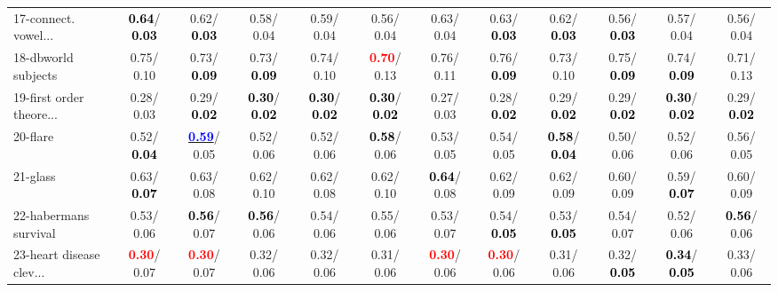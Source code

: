 \begin{table}[h]
\begin{center}
{\begin{tabular}{lc|c|c|c|c|c|c|c|c|c|c}
17-connect. vowel... & \textcolor{black}{\textbf{  0.64}}/\textcolor{black}{\textbf{  0.03}} &   0.62/\textcolor{black}{\textbf{  0.03}} &   0.58/  0.04 &   0.59/  0.04 &   0.56/  0.04 &   0.63/  0.04 &   0.63/\textcolor{black}{\textbf{  0.03}} &   0.62/\textcolor{black}{\textbf{  0.03}} &   0.56/\textcolor{black}{\textbf{  0.03}} &   0.57/  0.04 &   0.56/  0.04 \\
18-dbworld subjects &   0.75/  0.10 &   0.73/\textcolor{black}{\textbf{  0.09}} &   0.73/\textcolor{black}{\textbf{  0.09}} &   0.74/  0.10 & \textcolor{red}{\textbf{  0.70}}/  0.13 &   0.76/  0.11 &   0.76/\textcolor{black}{\textbf{  0.09}} &   0.73/  0.10 &   0.75/\textcolor{black}{\textbf{  0.09}} &   0.74/\textcolor{black}{\textbf{  0.09}} &   0.71/  0.13 \\
19-first order theore... &   0.28/  0.03 &   0.29/\textcolor{black}{\textbf{  0.02}} & \textcolor{black}{\textbf{  0.30}}/\textcolor{black}{\textbf{  0.02}} & \textcolor{black}{\textbf{  0.30}}/\textcolor{black}{\textbf{  0.02}} & \textcolor{black}{\textbf{  0.30}}/\textcolor{black}{\textbf{  0.02}} &   0.27/  0.03 &   0.28/\textcolor{black}{\textbf{  0.02}} &   0.29/\textcolor{black}{\textbf{  0.02}} &   0.29/\textcolor{black}{\textbf{  0.02}} & \textcolor{black}{\textbf{  0.30}}/\textcolor{black}{\textbf{  0.02}} &   0.29/\textcolor{black}{\textbf{  0.02}} \\
20-flare &   0.52/\textcolor{black}{\textbf{  0.04}} & \underline{\textcolor{blue}{\textbf{  0.59}}}/  0.05 &   0.52/  0.06 &   0.52/  0.06 & \textcolor{black}{\textbf{  0.58}}/  0.06 &   0.53/  0.05 &   0.54/  0.05 & \textcolor{black}{\textbf{  0.58}}/\textcolor{black}{\textbf{  0.04}} &   0.50/  0.06 &   0.52/  0.06 &   0.56/  0.05 \\
21-glass &   0.63/\textcolor{black}{\textbf{  0.07}} &   0.63/  0.08 &   0.62/  0.10 &   0.62/  0.08 &   0.62/  0.10 & \textcolor{black}{\textbf{  0.64}}/  0.08 &   0.62/  0.09 &   0.62/  0.09 &   0.60/  0.09 &   0.59/\textcolor{black}{\textbf{  0.07}} &   0.60/  0.09 \\ \hline
22-habermans survival &   0.53/  0.06 & \textcolor{black}{\textbf{  0.56}}/  0.07 & \textcolor{black}{\textbf{  0.56}}/  0.06 &   0.54/  0.06 &   0.55/  0.06 &   0.53/  0.07 &   0.54/\textcolor{black}{\textbf{  0.05}} &   0.53/\textcolor{black}{\textbf{  0.05}} &   0.54/  0.07 &   0.52/  0.06 & \textcolor{black}{\textbf{  0.56}}/  0.06 \\
23-heart disease clev... & \textcolor{red}{\textbf{  0.30}}/  0.07 & \textcolor{red}{\textbf{  0.30}}/  0.07 &   0.32/  0.06 &   0.32/  0.06 &   0.31/  0.06 & \textcolor{red}{\textbf{  0.30}}/  0.06 & \textcolor{red}{\textbf{  0.30}}/  0.06 &   0.31/  0.06 &   0.32/\textcolor{black}{\textbf{  0.05}} & \textcolor{black}{\textbf{  0.34}}/\textcolor{black}{\textbf{  0.05}} &   0.33/  0.06 \\

\end{tabular}}
\end{center}
\end{table}

